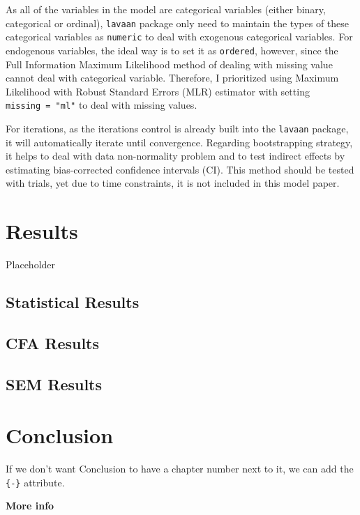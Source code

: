 \documentclass[
11pt, %
oneside, %
english, %
singlespacing, %
]{macthesis} %
\begin{document}
As all of the variables in the model are categorical variables (either binary, categorical or ordinal), \texttt{lavaan} package only need to maintain the types of these categorical variables as \texttt{numeric} to deal with exogenous categorical variables. For endogenous variables, the ideal way is to set it as \texttt{ordered}, however, since the Full Information Maximum Likelihood method of dealing with missing value cannot deal with categorical variable. Therefore, I prioritized using Maximum Likelihood with Robust Standard Errors (MLR) estimator with setting \texttt{missing\ =\ "ml"} to deal with missing values.

For iterations, as the iterations control is already built into the \texttt{lavaan} package, it will automatically iterate until convergence. Regarding bootstrapping strategy, it helps to deal with data non-normality problem and to test indirect effects by estimating bias-corrected confidence intervals (CI). This method should be tested with trials, yet due to time constraints, it is not included in this model paper.

\chapter{Results}\label{rmd-basics}

Placeholder

\section{Statistical Results}\label{statistical-results}

\section{CFA Results}\label{cfa-results}

\section{SEM Results}\label{sem-results}

\chapter*{Conclusion}\label{conclusion}

If we don't want Conclusion to have a chapter number next to it, we can add the \texttt{\{-\}} attribute.

\textbf{More info}
\end{document}
